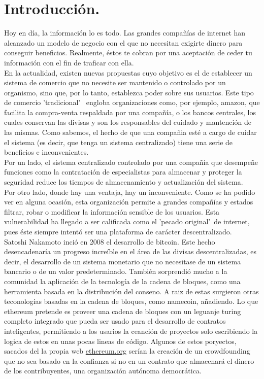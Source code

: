 \documentclass[11pt,a4paper]{article}
\begin{document}
\section{Introducción.}
Hoy en día, la información lo es todo. Las grandes compañías de internet han alcanzado un modelo de negocio con el que no necesitan exigirte dinero para conseguir beneficios. Realmente, éstos te cobran por una aceptación de ceder tu información con el fin de traficar con ella. \\

En la actualidad, existen nuevas propuestas cuyo objetivo es el de establecer un sistema de comercio que no necesite ser mantenido o controlado por un organismo, sino que, por lo tanto, establezca poder sobre sus usuarios. Este tipo de comercio 'tradicional' \ engloba organizaciones como, por ejemplo, amazon, que facilita la compra-venta respaldada por una compañía, o los bancos centrales, los cuales conservan las divisas y son los responsables del cuidado y mantención de las mismas. Como sabemos, el hecho de que una compañia esté a cargo de cuidar el sistema (es decir, que tenga un sistema centralizado) tiene una serie de beneficios e inconvenientes. \\

Por un lado, el sistema centralizado controlado por una compañía que desempeñe funciones como la contratación de especialistas para almacenar y proteger la seguridad reduce los tiempos de almacenamiento y actualización del sistema. \\

Por otro lado, donde hay una ventaja, hay un inconveniente. Como se ha podido ver en alguna ocasión\footnotemark, esta organización permite a grandes compañías y estados filtrar, robar o modificar la información sensible de los usuarios. Esta vulnerabilidad ha llegado a ser calificada como el 'pecado original'\ de internet, pues éste siempre intentó ser una plataforma de carácter descentralizado.\\

Satoshi Nakamoto inció en 2008 el desarrollo de bitcoin. Este hecho desencadenaría un progreso increíble en el área de las divisas descentralizadas, es decir, el desarrollo de un sistema monetario que no necesitase de un sistema bancario o de un valor predeterminado. También sorprendió mucho a la comunidad la aplicación de la tecnología de la cadena de bloques, como una herramienta basada en la distribución del conseno. A raiz de estas surgieron otras teconologías basadas en la cadena de bloques, como namecoin, añadiendo. Lo que ethereum pretende es proveer una cadena de bloques con un leguanje turing completo integrado que pueda ser usado para el desarrollo de contratos inteligentes, permitiendo a los usarios la ceanción de proyectos solo escribiendo la logica de estos en unas pocas lineas de código. Algunos de estos poryectos, sacados del la propia web \url{ethereum.org} serían la creación de un crowdfounding que no sea basado en la confianza si no en un contrato que almacenará el dinero de los contribuyentes, una organización autónoma democrática.\\
\end{document}
